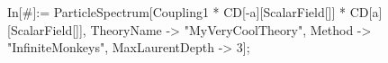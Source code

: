 In[\#]:= ParticleSpectrum[Coupling1 * CD[-a][ScalarField[]] * CD[a][ScalarField[]], TheoryName -> "MyVeryCoolTheory", Method -> "InfiniteMonkeys", MaxLaurentDepth -> 3]; 